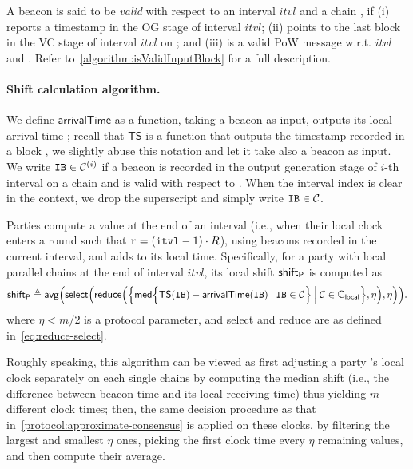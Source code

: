 A beacon  is said to be \emph{valid} with respect to an interval $itvl$ and a chain \chain, if (i)  reports a timestamp in the \textsf{OG} stage of interval $itvl$; (ii)  points to the last block in the \textsf{VC} stage of interval $itvl$ on \chain; and (iii)  is a valid PoW message w.r.t. $itvl$ and \chain.
%
Refer to~\cref{algorithm:isValidInputBlock} for a full description.

\paragraph{Shift calculation algorithm.}
%
We define $\mathsf{arrivalTime}$ as a function, taking a beacon  as input, outputs its local arrival time \protocolTime{\interval}{\round}; recall that $\mathsf{TS}$ is a function that outputs the timestamp recorded in a block \block, we slightly abuse this notation and let it take also a beacon as input.
%
We write $\mathtt{IB} \in \mathcal{C}^{(i)}$ if a beacon  is recorded in the output generation stage of $i$-th interval on a chain \chain and  is valid with respect to \chain.
%
When the interval index is clear in the context, we drop the superscript and simply write $\mathtt{IB} \in \mathcal{C}$.

Parties compute a value \shift at the end of an interval (i.e., when their local clock enters a round such that $\mathtt{r} = (\mathtt{itvl} - 1) \cdot R$), using beacons recorded in the current interval, and adds \shift to its local time.
%
Specifically, for a party \party with local parallel chains \parallelChainsLocal at the end of interval $itvl$, its local shift $\mathsf{shift}_\mathsf{P}$ is computed as
%
\begin{equation} \label{eq:sync-shift}
    \mathsf{shift}_\mathsf{P}
    \triangleq
    \mathsf{avg} \Big( \mathsf{select} \Big( \mathsf{reduce} \Big( \Big\{ \mathsf{med} \Big\{ \mathsf{TS}(\mathtt{IB}) - \mathsf{arrivalTime}(\mathtt{IB}) \mathbin\Big| \mathtt{IB} \in \mathcal{C} \Big\} \mathbin\Big| \mathcal{C} \in \mathbb{C}_{\mathsf{local}} \Big\}, \eta \Big), \eta \Big) \Big).
\end{equation}
%
where $\eta < m / 2$ is a protocol parameter, and \textsf{select} and \textsf{reduce} are as defined in~\cref{eq:reduce-select}.

Roughly speaking, this algorithm can be viewed as first adjusting a party \party's local clock separately on each single chains by computing the median shift (i.e., the difference between beacon time and its local receiving time) thus yielding $m$ different clock times; then, the same decision procedure as that in~\cref{protocol:approximate-consensus} is applied on these clocks, by filtering the largest and smallest $\eta$ ones, picking the first clock time every $\eta$ remaining values, and then compute their average.

